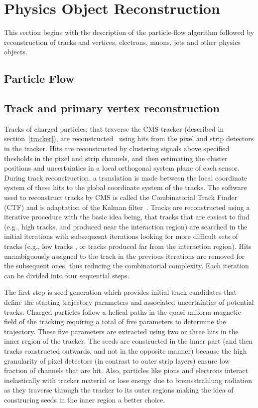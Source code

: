 \section{Physics Object Reconstruction}
\label{p_ob_recon}
This section begins with the description of the particle-flow algorithm followed by reconstruction of tracks and vertices, electrons, muons, jets and other physics objects.  
\subsection{Particle Flow}
\label{p_flow}
\subsection{Track and primary vertex reconstruction}
\label{track_recon}

Tracks of charged particles, that traverse the CMS tracker (described in section~\ref{tracker}), are reconstructed~\cite{track_reconstruction} using hits from the pixel and strip detectors in the tracker. Hits are reconstructed by clustering signals above specified thesholds in the pixel and strip channels, and then estimating the cluster positions and uncertainties in a local orthogonal system plane of each sensor. During track reconstruction, a translation is made between the local coordinate system of these hits to the global coordinate system of the tracks. The software used to reconstruct tracks by CMS is called the Combinatorial Track Finder (CTF) and is adaptation of the Kalman filter~\cite{kalman_filter}. Tracks are reconstructed using a iterative procedure with the basic idea being, that tracks that are easiest to find (e.g., high \pt tracks, and produced near the interaction region) are searched in the initial iterations with subsequesnt iterations looking for more difficult sets of tracks (e.g., low \pt tracks , or tracks produced far from the interaction region). Hits unambiguously assigned to the track in the previous iterations are removed for the subsequent ones, thus reducing the combinatorial complexity. Each iteration can be divided into four sequential steps.

The first step is seed generation which provides initial track candidates that define the starting trajectory parameters and associated uncertainties of potential tracks. Charged particles follow a helical paths in the quasi-uniform magnetic field of the tracking requiring a total of five parameters to determine the trajectory. These five parameters are extracted using two or three hits in the inner region of the tracker. The seeds are constructed in the inner part (and then tracks constructed outwards, and not in the opposite manner) because the high granularity of pixel detectors (in contrast to outer strip layers)  ensure low fraction of channels that are hit. Also, particles like pions and electrons interact inelastically with tracker material or lose energy due to bremsstrahlung radiation as they traverse through the tracker to its outer regions making the idea of construcing seeds in the inner region a better choice.

